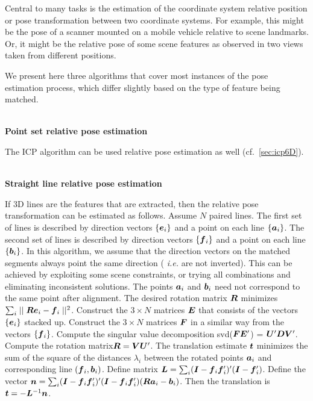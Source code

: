 \documentclass[twocolumn,oneside]{book}
\newcommand{\V}[1]{\vector{#1}}  %
\newcommand{\M}[1]{\V{#1}}    %
\begin{document}
Central to many tasks is the estimation of the coordinate system
relative position or pose transformation between two coordinate
systems.  For example, this might be the pose of a scanner mounted on
a mobile vehicle relative to scene landmarks.  Or, it might be the
relative pose of some scene features as observed in two views taken
from different positions.

We present here three algorithms that cover most instances of the pose
estimation process, which differ slightly based on the type of feature
being matched.

\ \\
\noindent
{\bf Point set relative pose estimation}

The ICP algorithm can be used relative pose estimation as well
(cf.~\ref{sec:icp6D}).

\ \\
\noindent
{\bf Straight line relative pose estimation}

If 3D lines are the features that are extracted, then the relative
pose transformation can be estimated as follows.  Assume $N$ paired
lines.  The first set of lines is described by direction vectors $\{\V
e_i\}$ and a point on each line $\{\V a_i\}$.  The second set of lines
is described by direction vectors $\{\V f_i\}$ and a point on each
line $\{\V b_i\}$.  In this algorithm, we assume that the direction
vectors on the matched segments always point the same direction ({\it
  i.e.} are not inverted). This can be achieved by exploiting some
scene constraints, or trying all combinations and eliminating
inconsistent solutions. The points $\V a_i$ and $\V b_i$ need not
correspond to the same point after alignment. The desired rotation
matrix $\M R$ minimizes $\sum_i \mid\mid \M R \V e_i - \V f_i
\mid\mid^2$.  Construct the $3 \times N$ matrices $\M E$ that consists
of the vectors $\{ \V e_i \}$ stacked up. Construct the $3 \times N$
matrices $\M F$ in a similar way from the vectors $\{ \V f_i \}$.
Compute the singular value decomposition svd($\M F \M E'$) =
$\M U' \M D \M V'$. Compute the rotation
matrix\footnotemark[1] $\M R = \M V \M U'$. The
translation estimate $\V t$ minimizes the sum of the square of
the distances $\lambda_i$ between the rotated points $\V a_i$
and corresponding line $(\V f_i, \V b_i)$.  Define matrix
$\M L = \sum_i (\M I - \V f_i \V f_i')'(\M I - \V f_i')$.
Define the vector $\V n = \sum_i (\M I -\V f_i \V f_i')' (\M I -
\V f_i \V f_i') (\M R \V a_i - \V b_i)$.  Then the translation is
$\V t = - \V L^{-1}\V n$.
\end{document}
